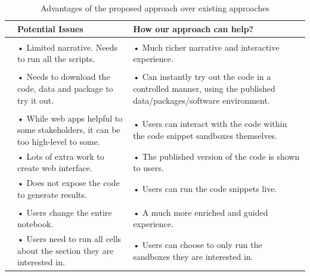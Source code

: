 \begin{Schunk}
\begin{table}

\caption{\label{tab:tb2-latex}Advantages of the proposed approach over existing approaches}
\centering
\begin{tabular}[t]{>{\raggedright\arraybackslash}p{0.1em}>{\raggedright\arraybackslash}p{18em}>{\raggedright\arraybackslash}p{18em}}
\toprule
 & Potential Issues & How our approach can help?\\
\midrule
\addlinespace[0.3em]
\multicolumn{3}{l}{\textbf{R script}}\\
\hspace{1em} & • Limited narrative. Needs to run all the scripts. & • Much richer narrative and interactive experience.\\
\midrule
\addlinespace[0.3em]
\multicolumn{3}{l}{\textbf{Static notebooks}}\\
\hspace{1em} & • Needs to download the code, data and package to try it out. & • Can instantly try out the code in a controlled manner, using the published data/packages/software environment.\\
\midrule
\addlinespace[0.3em]
\multicolumn{3}{l}{\textbf{Web apps (e.g. Shiny)}}\\
\hspace{1em} & • While web apps helpful to some stakeholders, it can be too high-level to some. & • Users can interact with the code within the code snippet sandboxes themselves.\\
\hspace{1em} & • Lots of extra work to create web interface. & • The published version of the code is shown to users.\\
\hspace{1em} & • Does not expose the code to generate results. & • Users can run the code snippets live.\\
\midrule
\addlinespace[0.3em]
\multicolumn{3}{l}{\textbf{Binder/Google Colab}}\\
\hspace{1em} & • Users change the entire notebook. & • A much more enriched and guided experience.\\
\hspace{1em} & • Users need to run all cells about the section they are interested in. & • Users can choose to only run the sandboxes they are interested in.\\
\bottomrule
\end{tabular}
\end{table}

\end{Schunk}

